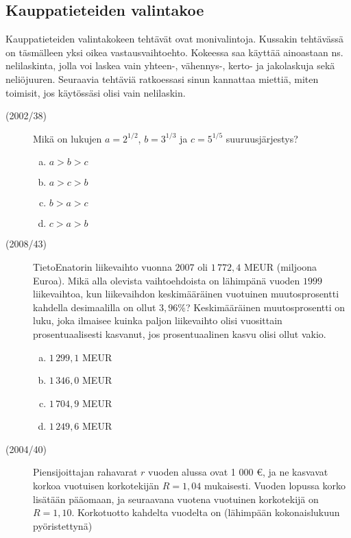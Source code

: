 \subsection{Kauppatieteiden valintakoe}

Kauppatieteiden valintakokeen tehtävät ovat monivalintoja. Kussakin tehtävässä on täsmälleen yksi oikea vastausvaihtoehto. Kokeessa saa käyttää ainoastaan ns. nelilaskinta, jolla voi laskea vain yhteen-, vähennys-, kerto- ja jakolaskuja sekä neliöjuuren. Seuraavia tehtäviä ratkoessasi sinun kannattaa miettiä, miten toimisit, jos käytössäsi olisi vain nelilaskin.

\begin{description}
	\item[(2002/38)] Mikä on lukujen $a=2^{1/2}$, $b=3^{1/3}$ ja $c=5^{1/5}$ suuruusjärjestys?
        
		\begin{enumerate}[(a)]
			\item $a>b>c$
			\item $a>c>b$
			\item $b>a>c$
			\item $c>a>b$
		\end{enumerate}


	\item[(2008/43)] TietoEnatorin liikevaihto vuonna $2007$ oli $1\,772{,}4$ MEUR (miljoona Euroa). Mikä
	alla olevista vaihtoehdoista on lähimpänä vuoden $1999$ liikevaihtoa, kun
	liikevaihdon keskimääräinen vuotuinen muutosprosentti kahdella desimaalilla on
	ollut $3{,}96 \%$? Keskimääräinen muutosprosentti on luku, joka ilmaisee kuinka paljon
	liikevaihto olisi vuosittain prosentuaalisesti kasvanut, jos prosentuaalinen kasvu olisi
	ollut vakio.
        
		\begin{enumerate}[(a)]
			\item $1\,299{,}1$ MEUR
			\item $1\,346{,}0$ MEUR
			\item $1\,704{,}9$ MEUR
			\item $1\,249{,}6$ MEUR
		\end{enumerate}


	\item[(2004/40)] Piensijoittajan rahavarat $r$ vuoden alussa ovat 1 000 \euro, ja ne kasvavat korkoa vuotuisen korkotekijän $R=1{,}04$ mukaisesti. Vuoden lopussa korko lisätään pääomaan, ja seuraavana vuotena vuotuinen korkotekijä on $R=1{,}10$. Korkotuotto kahdelta vuodelta on (lähimpään kokonaislukuun pyöristettynä)
        

\end{description}
